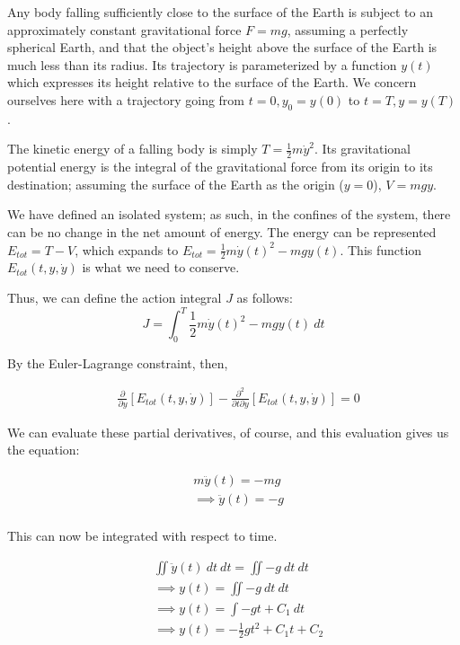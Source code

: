 \documentclass[%
 amsmath,amssymb,
aps,
 fleqn,
 notitlepage,
]{revtex4-2}
\begin{document}
Any body falling sufficiently close to the surface of the Earth is subject to an approximately constant gravitational force $F = mg$, assuming a perfectly spherical Earth, and that the object's height above the surface of the Earth is much less than its radius.  Its trajectory is parameterized by a function $y(t)$ which expresses its height relative to the surface of the Earth.  We concern ourselves here with a trajectory going from $t = 0, y_0 = y(0)$ to $t = T, y = y(T)$.

The kinetic energy of a falling body is simply $\displaystyle T = \frac12 m\dot y^2$.  Its gravitational potential energy is the integral of the gravitational force from its origin to its destination; assuming the surface of the Earth as the origin ($y = 0$), $\displaystyle V = mgy$.

We have defined an isolated system; as such, in the confines of the system, there can be no change in the net amount of energy.  The energy can be represented $E_{tot} = T - V$, which expands to $\displaystyle E_{tot} = \frac12m\dot y(t)^2 - mgy(t)$.  This function $E_{tot}(t, y, \dot y)$ is what we need to conserve.

Thus, we can define the action integral $J$ as follows:
\[
    J = \int_0^T \frac12m\dot y(t)^2 - mgy(t) ~ dt
\]

By the Euler-Lagrange constraint, then,

\begin{align*}
  &\frac{∂}{∂y} \left[E_{tot}(t, y, \dot y)\right] - \frac{∂^2}{∂t∂y} \left[E_{tot}(t, y, \dot y)\right] = 0
\end{align*}

We can evaluate these partial derivatives, of course, and this evaluation gives us the equation:

\begin{align*}
  &m\ddot y(t) = -mg\\
  &⟹ \ddot y(t) = -g\\
\end{align*}

This can now be integrated with respect to time.

\begin{align*}
  &\iint \ddot y(t) ~ dt ~ dt = \iint -g ~ dt ~ dt\\
  &⟹ y(t) = \iint -g ~ dt ~ dt\\
  &⟹ y(t) = \int -gt + C_1 ~ dt\\
  &⟹ y(t) = -\frac12gt^2 + C_1t + C_2\\
\end{align*}
\end{document}
